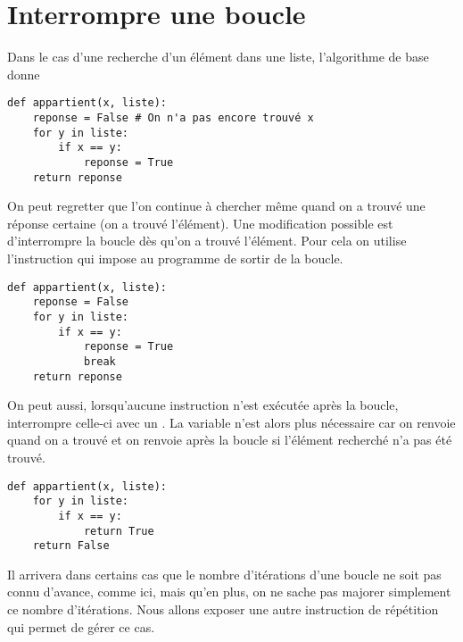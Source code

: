 \section{Interrompre une boucle}
Dans le cas d'une recherche d'un élément dans une liste, l'algorithme de base donne
\begin{lstlisting}
def appartient(x, liste):
    reponse = False # On n'a pas encore trouvé x
    for y in liste:
        if x == y:
            reponse = True
    return reponse
\end{lstlisting}
On peut regretter que l'on continue à chercher même quand on a trouvé une réponse certaine (on a trouvé l'élément). Une modification possible est d'interrompre la boucle dès qu'on a trouvé l'élément. Pour cela on utilise l'instruction  qui impose au programme de sortir de la boucle.
\begin{lstlisting}
def appartient(x, liste):
    reponse = False 
    for y in liste:
        if x == y:
            reponse = True
            break
    return reponse
\end{lstlisting}
On peut aussi, lorsqu'aucune instruction n'est exécutée après la boucle, interrompre celle-ci avec un . La variable n'est alors plus nécessaire car on renvoie  quand on a trouvé et on renvoie  après la boucle si l'élément recherché n'a pas été trouvé.
\begin{lstlisting}
def appartient(x, liste):
    for y in liste:
        if x == y:
            return True
    return False
\end{lstlisting}
Il arrivera dans certains cas que le nombre d'itérations d'une boucle ne soit pas connu d'avance, comme ici, mais qu'en plus, on ne sache pas majorer simplement ce nombre d'itérations. Nous allons exposer une autre instruction de répétition qui permet de gérer ce cas.
